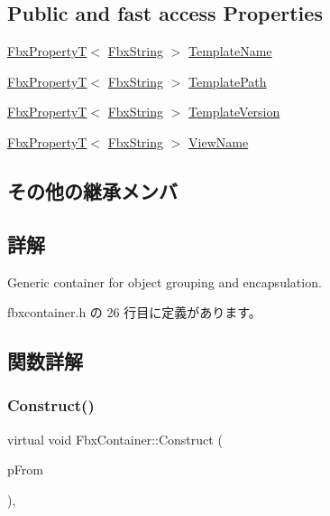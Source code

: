 \subsection*{Public and fast access Properties}
\begin{DoxyCompactItemize}
\item 
\hyperlink{class_fbx_property_t}{Fbx\+PropertyT}$<$ \hyperlink{class_fbx_string}{Fbx\+String} $>$ \hyperlink{class_fbx_container_a44b1cee6dbe9941f8fdfa25937d85ce2}{Template\+Name}
\item 
\hyperlink{class_fbx_property_t}{Fbx\+PropertyT}$<$ \hyperlink{class_fbx_string}{Fbx\+String} $>$ \hyperlink{class_fbx_container_a8d66563e359fda83e5b67017140e97d1}{Template\+Path}
\item 
\hyperlink{class_fbx_property_t}{Fbx\+PropertyT}$<$ \hyperlink{class_fbx_string}{Fbx\+String} $>$ \hyperlink{class_fbx_container_a0fcd3f02b0b9df51cfd82902c794e709}{Template\+Version}
\item 
\hyperlink{class_fbx_property_t}{Fbx\+PropertyT}$<$ \hyperlink{class_fbx_string}{Fbx\+String} $>$ \hyperlink{class_fbx_container_afdbbb7add5452cf3ee2fcf13c47a00cf}{View\+Name}
\end{DoxyCompactItemize}
\subsection*{その他の継承メンバ}


\subsection{詳解}
Generic container for object grouping and encapsulation. 

 fbxcontainer.\+h の 26 行目に定義があります。



\subsection{関数詳解}
\mbox{\label{class_fbx_container_a65204439a64fd2184467e41d994bec0a}} 
\subsubsection{\texorpdfstring{Construct()}{Construct()}}
{\footnotesize\ttfamily virtual void Fbx\+Container\+::\+Construct (\begin{DoxyParamCaption}\item[{const \hyperlink{class_fbx_object}{Fbx\+Object} $\ast$}]{p\+From }\end{DoxyParamCaption})\hspace{0.3cm}{\ttfamily [protected]}, {\ttfamily [virtual]}}


